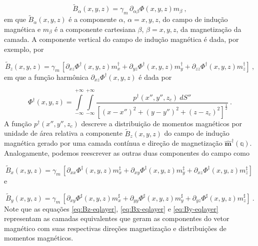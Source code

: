 \begin{equation}
\tilde{B}_{\alpha}(x, y, z) = \gamma_{m} \, \partial_{\alpha\beta} \Phi(x, y, z) m_{\beta} \: ,
\label{eq:B-eqlayer-notacao-einstein}
\end{equation}
em que $\tilde{B}_{\alpha} (x,y,z)$ é a componente $\alpha$, $\alpha=x,y,z$, do campo de indução magnética e $m_{\beta}$ é a componente cartesiana $\beta$, $\beta =x,y,z$, da magnetização da camada. A componente vertical do campo de indução magnética é dada, por exemplo, por 

\begin{equation}
\tilde{B}_{z}(x, y, z) = \gamma_{m} \,[ \partial_{xz} \Phi^{\dagger}(x, y, z) m_{x}^{\dagger} + \partial_{yz} \Phi^{\dagger}(x, y, z) m_{y}^{\dagger} + \partial_{zz} \Phi^{\dagger}(x, y, z) m_{z}^{\dagger} ]  \: ,
\label{eq:Bz-eqlayer}
\end{equation}
em que a função harmônica $\partial_{xz} \Phi^{\dagger}(x, y, z)$ é dada por 

\begin{equation}
\Phi^{\dagger}(x, y, z) = \int\limits_{-\infty}^{+\infty}\int\limits_{-\infty}^{+\infty}
\frac{p^{\dagger}(x'', y'', z_{c}) \: dS''}
{\left[ (x-x'')^2 + (y-y'')^2 + (z-z_{c})^2 \right]^{\frac{1}{2}}} \: .
\label{eq:Phi-integral-superficie-Bz}
\end{equation}
A função $p^{\dagger}(x'', y'', z_{c})$ descreve a distribuição de momentos magnéticos por unidade de área relativa a componente $\tilde{B}_{z}(x, y, z)$ do campo de indução magnética gerado por uma camada contínua e direção de magnetização $\hat{\mathbf{m}}^{\dagger}(\mathbb{q})$. Analogamente, podemos reescrever as outras duas componentes do campo como

\begin{equation}
\tilde{B}_{x}(x, y, z) = \gamma_{m} \, [\partial_{xx} \Phi^{\ddagger}(x, y, z) m_{x}^{\ddagger} + \partial_{xy} \Phi^{\ddagger}(x, y, z) m_{y}^{\ddagger} + \partial_{xz} \Phi^{\ddagger}(x, y, z) m_{z}^{\ddagger}]   \: 
\label{eq:Bx-eqlayer}
\end{equation}
e 

\begin{equation}
\tilde{B}_{y}(x, y, z) = \gamma_{m} \, [\partial_{xy} \Phi^{\sharp}(x, y, z) m_{x}^{\sharp} + \partial_{yy} \Phi^{\sharp}(x, y, z) m_{y}^{\sharp} + \partial_{yz} \Phi^{\sharp}(x, y, z) m_{z}^{\sharp}]   \: .
\label{eq:By-eqlayer}
\end{equation}
Note que as equações \ref{eq:Bz-eqlayer}, \ref{eq:Bx-eqlayer} e \ref{eq:By-eqlayer} representam as camadas equivalentes que geram as componentes do vetor magnético com suas respectivas direções magnetização e distribuições de momentos magnéticos. 

